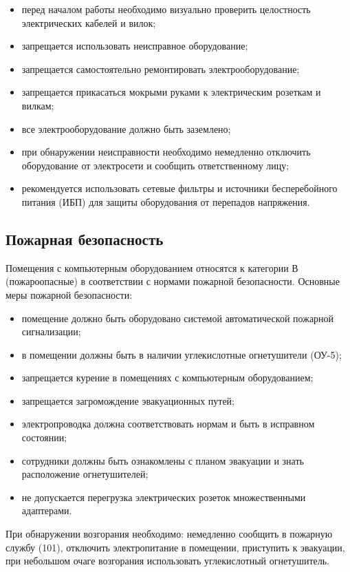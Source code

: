 \documentclass[14pt,a4paper,oneside]{extarticle}
\begin{document}
\begin{itemize}[leftmargin=2cm]
    \item перед началом работы необходимо визуально проверить целостность электрических кабелей и вилок;
    \item запрещается использовать неисправное оборудование;
    \item запрещается самостоятельно ремонтировать электрооборудование;
    \item запрещается прикасаться мокрыми руками к электрическим розеткам и вилкам;
    \item все электрооборудование должно быть заземлено;
    \item при обнаружении неисправности необходимо немедленно отключить оборудование от электросети и сообщить ответственному лицу;
    \item рекомендуется использовать сетевые фильтры и источники бесперебойного питания (ИБП) для защиты оборудования от перепадов напряжения.
\end{itemize}

\subsection{Пожарная безопасность}

Помещения с компьютерным оборудованием относятся к категории В (пожароопасные) в соответствии с нормами пожарной безопасности. Основные меры пожарной безопасности:

\begin{itemize}[leftmargin=2cm]
    \item помещение должно быть оборудовано системой автоматической пожарной сигнализации;
    \item в помещении должны быть в наличии углекислотные огнетушители (ОУ-5);
    \item запрещается курение в помещениях с компьютерным оборудованием;
    \item запрещается загромождение эвакуационных путей;
    \item электропроводка должна соответствовать нормам и быть в исправном состоянии;
    \item сотрудники должны быть ознакомлены с планом эвакуации и знать расположение огнетушителей;
    \item не допускается перегрузка электрических розеток множественными адаптерами.
\end{itemize}

При обнаружении возгорания необходимо: немедленно сообщить в пожарную службу (101), отключить электропитание в помещении, приступить к эвакуации, при небольшом очаге возгорания использовать углекислотный огнетушитель.
\end{document}
